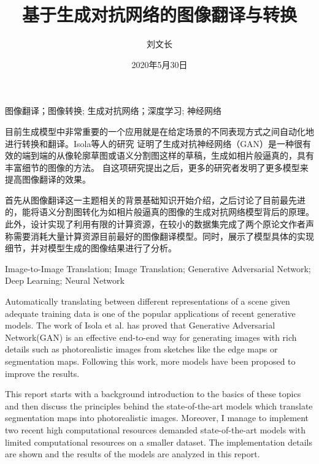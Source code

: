 \documentclass[supercite]{HustGraduPaper}
\title{基于生成对抗网络的图像翻译与转换}
\author{刘文长}
\date{2020年5月30日}
\theoremstyle{definition}
\begin{document}
\maketitle

\statement

\clearpage


\begin{cnabstract}{图像翻译；图像转换; 生成对抗网络；深度学习; 神经网络}

目前生成模型中非常重要的一个应用就是在给定场景的不同表现方式之间自动化地进行转换和翻译。Isola等人的研究\cite{pix2pix2016}
证明了生成对抗神经网络（GAN）是一种很有效的端到端的从像轮廓草图或语义分割图这样的草稿，生成如相片般逼真的，具有丰富细节的图像的方法。
自这项研究提出之后，更多的研究者发明了更多模型来提高图像翻译的效果。

首先从图像翻译这一主题相关的背景基础知识开始介绍，之后讨论了目前最先进的，能将语义分割图转化为如相片般逼真的图像的生成对抗网络模型背后的原理。
此外，设计实现了利用有限的计算资源，在较小的数据集完成了两个原论文作者声称需要消耗大量计算资源目前最好的图像翻译模型。同时，展示了模型具体的实现
细节，并对模型生成的图像结果进行了分析。

\end{cnabstract}

\begin{enabstract}{Image-to-Image Translation; Image Translation; Generative Adversarial Network; Deep Learning; Neural Network}

Automatically translating between different representations of a scene given 
adequate training data 
is one of the popular applications of recent generative models. 
The work of Isola et al.\cite{pix2pix2016} has proved that 
Generative Adversarial Network(GAN) is an effective end-to-end way for generating images 
with rich details such as photorealistic images from sketches like the edge maps or segmentation maps. 
Following this work, more models have been proposed to improve the results. 

This report starts with a background introduction to the basics of these topics
and then discuss the principles behind the state-of-the-art models 
which translate segmentation maps into photorealistic images. 
Moreover, I manage to implement two recent high computational resources demanded 
state-of-the-art models with limited computational resources on a smaller dataset. 
The implementation details are shown and 
the results of the models are analyzed in this report.

\end{enabstract}
\end{document}
